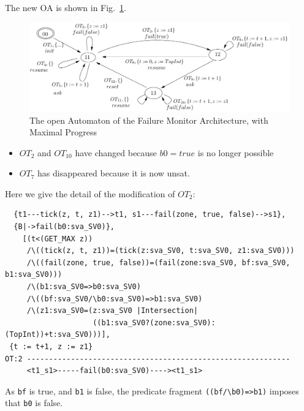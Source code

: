 \documentclass{llncs}
\newcommand{\Eric}{\\\hfill\mdash Eric}
\newcommand{\noteEMin}[2][inline,color=green!40]{\todo[#1]{{#2}\Eric}}
\newcommand{\fig}[1]{Fig.~\ref{fig:#1}}
\newcommand{\mdash}[1][]{---#1}
\begin{document}
  The new OA is shown in \fig{ArchFailure:OA-MaxProgress}.

  \begin{figure}[t]
  \centering
  \includegraphics[width=\columnwidth]{TimerOAMaxProgress}
  \caption{The open Automaton of the Failure Monitor Architecture,
    with Maximal Progress}
  \label{fig:ArchFailure:OA-MaxProgress}
\end{figure}

\begin{itemize}
\item $OT_2$ and $OT_{10}$ have changed because $b0=true$ is no longer possible
\item $OT_7$ has disappeared because it is now unsat.
\end{itemize}

  Here we give the detail of the modification of $OT_2$:

\bigskip
\begin{verbatim}
  {t1---tick(z, t, z1)-->t1, s1---fail(zone, true, false)-->s1},
  {B|->fail(b0:sva_SV0)},
    [(t<(GET_MAX z))
     /\((tick(z, t, z1))=(tick(z:sva_SV0, t:sva_SV0, z1:sva_SV0)))
     /\((fail(zone, true, false))=(fail(zone:sva_SV0, bf:sva_SV0, b1:sva_SV0)))
     /\(b1:sva_SV0=>b0:sva_SV0)
     /\((bf:sva_SV0/\b0:sva_SV0)=>b1:sva_SV0)
     /\(z1:sva_SV0=(z:sva_SV0 |Intersection|
                    ((b1:sva_SV0?(zone:sva_SV0):(TopInt))+t:sva_SV0)))],
 {t := t+1, z := z1}
OT:2 ------------------------------------------------------------
     <t1_s1>-----fail(b0:sva_SV0)----><t1_s1>
\end{verbatim}
\bigskip

As \verb|bf| is true, and \verb|b1| is false, the predicate fragment
\verb|((bf/\b0)=>b1)| imposes that \verb|b0| is false.


    
\end{document}
